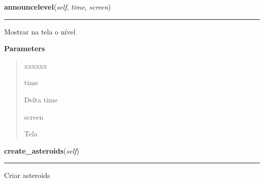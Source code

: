     \vspace{0.5ex}

\hspace{.8\funcindent}\begin{boxedminipage}{\funcwidth}

    \raggedright \textbf{announcelevel}(\textit{self}, \textit{time}, \textit{screen})

    \vspace{-1.5ex}

    \rule{\textwidth}{0.5\fboxrule}
\setlength{\parskip}{2ex}
    Mostrar na tela o nível

\setlength{\parskip}{1ex}
      \textbf{Parameters}
      \vspace{-1ex}

      \begin{quote}
        \begin{Ventry}{xxxxxx}

          \item[time]

          Delta time

          \item[screen]

          Tela

        \end{Ventry}

      \end{quote}

    \end{boxedminipage}

    \label{pygame-asteroids:game:GameController:create_asteroids}

    \vspace{0.5ex}

\hspace{.8\funcindent}\begin{boxedminipage}{\funcwidth}

    \raggedright \textbf{create\_asteroids}(\textit{self})

    \vspace{-1.5ex}

    \rule{\textwidth}{0.5\fboxrule}
\setlength{\parskip}{2ex}
    Criar asteroids

\setlength{\parskip}{1ex}
    \end{boxedminipage}

